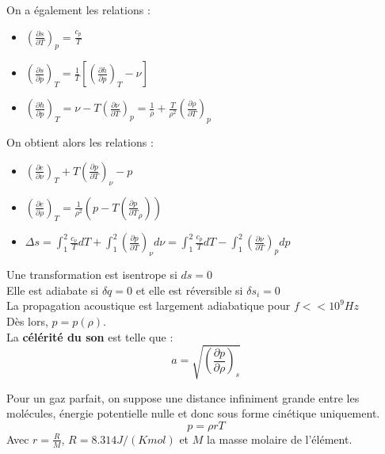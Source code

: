 \documentclass[../main.tex]{subfiles}
\begin{document}
On a également les relations : \begin{itemize}
    \item $(\frac{\partial s}{\partial T})_p = \frac{c_p}{T}$\\
    \item $(\frac{\partial s}{\partial p})_T = \frac{1}{T}[(\frac{\partial h}{\partial p})_T-\nu]$\\
    \item $(\frac{\partial h}{\partial p})_T = \nu - T(\frac{\partial \nu}{\partial T})_p = \frac{1}{\rho} + \frac{T}{\rho^2} (\frac{\partial \rho}{\partial T})_p$\\
\end{itemize}

On obtient alors les relations : \begin{itemize}
    \item $(\frac{\partial e}{\partial \nu})_T + T(\frac{\partial p}{\partial T})_\nu -p$\\
    \item $(\frac{\partial e}{\partial \rho})_T = \frac{1}{\rho^2}(p-T(\frac{\partial p}{\partial T}_\rho))$\\
    \item $\Delta s = \int_1^2 \frac{c_\nu}{T}dT + \int_1^2 (\frac{\partial p}{\partial T})_\nu d\nu = \int_1^2 \frac{c_p}{T}dT - \int_1^2 (\frac{\partial \nu}{\partial T})_p dp$\\
\end{itemize}

Une transformation est isentrope si $ds=0$\\
Elle est adiabate si $\delta q=0$ et elle est réversible si $\delta s_i = 0$\\

\warning La propagation acoustique est largement adiabatique pour $f<<10^9Hz$\\

Dès lors, $p = p(\rho)$.\\
La \textbf{célérité du son} est telle que : \begin{equation}
    a = \sqrt{(\frac{\partial p}{\partial \rho})_s}
\end{equation}

Pour un gaz parfait, on suppose une distance infiniment grande entre les molécules, énergie potentielle nulle et donc sous forme cinétique uniquement.\\

\begin{equation}
    p = \rho r T
\end{equation}
Avec $r = \frac{R}{M}$, $R = 8.314 J/(K mol)$ et $M$ la masse molaire de l'élément.\\
\end{document}
